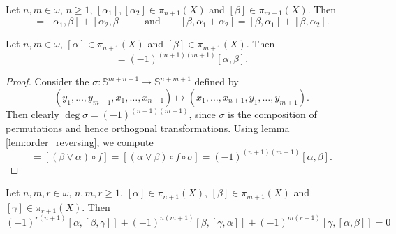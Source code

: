 \begin{proposition}
	Let $n,m \in \omega$, $n \geq 1$, $[\alpha_1], [\alpha_2] \in \pi_{n + 1}(X)$ and $[\beta] \in \pi_{m + 1}(X)$. Then
	\begin{equation*}
		[\alpha_1 + \alpha_2, \beta] = [\alpha_1,\beta] + [\alpha_2,\beta] \qquad \text{and} \qquad [\beta,\alpha_1 + \alpha_2] = [\beta,\alpha_1] + [\beta,\alpha_2].
	\end{equation*}
\end{proposition}

\begin{proposition}
	Let $n,m \in \omega$, $[\alpha] \in \pi_{n + 1}(X)$ and $[\beta] \in \pi_{m + 1}(X)$. Then
	\begin{equation*}
		[\beta,\alpha] = (-1)^{(n + 1)(m + 1)}[\alpha,\beta].
	\end{equation*}
\end{proposition}

\begin{proof}
	Consider the  $\sigma : \mathbb{S}^{m + n + 1} \to \mathbb{S}^{n + m + 1}$ defined by
	\begin{equation*}
		(y_1,\dots,y_{m + 1},x_1,\dots,x_{n + 1}) \mapsto (x_1, \dots,x_{n + 1},y_1,\dots,y_{m + 1}).
	\end{equation*}
	Then clearly $\deg \sigma = (-1)^{(n + 1)(m + 1)}$, since $\sigma$ is the composition of permutations and hence orthogonal transformations. Using lemma \ref{lem:order_reversing}, we compute
	\begin{equation*}
		[\beta,\alpha] = [(\beta \vee \alpha) \circ f] = [(\alpha \vee \beta) \circ f \circ \sigma] = (-1)^{(n + 1)(m + 1)}[\alpha,\beta].
	\end{equation*}
\end{proof}

\begin{proposition}
	Let $n,m,r \in \omega$, $n,m,r \geq 1$, $[\alpha] \in \pi_{n + 1}(X)$, $[\beta] \in \pi_{m + 1}(X)$ and $[\gamma] \in \pi_{r + 1}(X)$. Then
	\begin{equation*}
		(-1)^{r(n + 1)}[\alpha,[\beta,\gamma]] + (-1)^{n(m + 1)}[\beta,[\gamma,\alpha]] + (-1)^{m(r + 1)}[\gamma,[\alpha,\beta]] = 0
	\end{equation*}
\end{proposition}

\printbibliography

